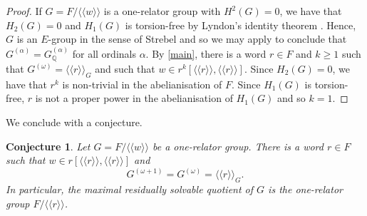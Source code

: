 \documentclass{amsart}
\newtheorem{conjecture}[theorem]{Conjecture}
\theoremstyle{definition}
\newcommand{\Q}{\mathbb{Q}}
\newcommand{\normal}[1]{\langle\!\langle #1 \rangle\!\rangle}
\begin{document}
\begin{proof}
If $G = F/\normal{w}$ is a one-relator group with $H^2(G) = 0$, we have that $H_2(G) = 0$ and $H_1(G)$ is torsion-free by Lyndon's identity theorem \cite{Ly50}. Hence, $G$ is an $E$-group in the sense of Strebel and so we may apply \cite[Theorem A]{St74} to conclude that $G^{(\alpha)} = G_{\Q}^{(\alpha)}$ for all ordinals $\alpha$. By \cref{main}, there is a word $r\in F$ and $k\geqslant 1$ such that $G^{(\omega)} = \normal{r}_G$ and such that $w\in r^k[\normal{r}, \normal{r}]$. Since $H_2(G) = 0$, we have that $r^k$ is non-trivial in the abelianisation of $F$. Since $H_1(G)$ is torsion-free, $r$ is not a proper power in the abelianisation of $H_1(G)$ and so $k = 1$.
\end{proof}


We conclude with a conjecture.

\begin{conjecture}
\label{conjecture}
Let $G = F/\normal{w}$ be a one-relator group. There is a word $r\in F$ such that $w\in r[\normal{r}, \normal{r}]$ and
    \[
    G^{(\omega+1)} = G^{(\omega)}  = \normal{r}_G.
    \]
In particular, the maximal residually solvable quotient of $G$ is the one-relator group $F/\normal{r}$.
\end{conjecture}






\end{document}
